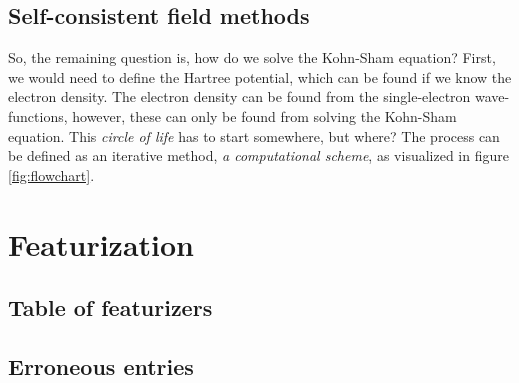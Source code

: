 \section{Self-consistent field methods}
\label{appendix:self-consistent}

So, the remaining question is, how do we solve the Kohn-Sham equation? First, we would need to define the Hartree potential, which can be found if we know the electron density. The electron density can be found from the single-electron wave-functions, however, these can only be found from solving the Kohn-Sham equation. This \textit{circle of life} has to start somewhere, but where? The process can be defined as an iterative method, \textit{a computational scheme}, as visualized in figure \ref{fig:flowchart}.

\clearpage


\clearpage

\chapter{Featurization}

\section{Table of featurizers}


\newpage

\section{Erroneous entries}



\clearpage


